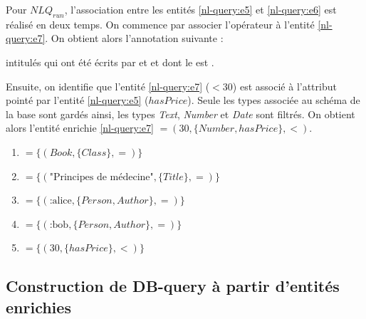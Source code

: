 \begin{example}
    \label{ex:nl-query:enrichEnts}
    Pour $NLQ_{run}$, l'association entre les entités \ref{nl-query:e5}  et \ref{nl-query:e6}  est réalisé en deux temps.
    On commence par associer l'opérateur  à l'entité \ref{nl-query:e7}.
    On obtient alors l'annotation suivante :
    \begin{displayquote}
         intitulés  qui ont été écrits par  et  et dont le  est .
    \end{displayquote}
    Ensuite, on identifie que l'entité \ref{nl-query:e7} ($<30$) est associé à l'attribut pointé par l'entité \ref{nl-query:e5} ($hasPrice$).
    Seule les types associée au schéma de la base sont gardés ainsi, les types \emph{Text}, \emph{Number} et \emph{Date} sont filtrés.
    On obtient alors l'entité enrichie \ref{nl-query:e7} $= (30, \{Number, hasPrice\}, <)$.
    \begin{multicols}{2}
        \begin{enumerate}[label=$E_{e\arabic*}$]
            \item \label{nl-query:ee1} $= \{(Book, \{Class\}, =)\}$
            \item \label{nl-query:ee2} $= \{(\text{"Principes de médecine"}, \{Title\}, =)\}$
            \item \label{nl-query:ee3} $= \{(\text{:alice}, \{Person, Author\}, =)\}$
            \item \label{nl-query:ee4} $= \{(\text{:bob}, \{Person, Author\}, =)\}$
            \item \label{nl-query:ee5} $= \{(30, \{hasPrice\}, <)\}$
        \end{enumerate}
    \end{multicols}
\end{example}

\subsection{Construction de DB-query à partir d'entités enrichies}


